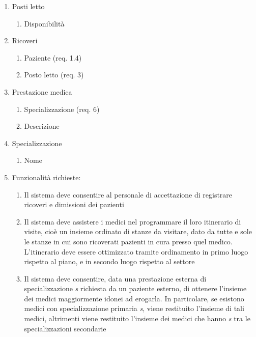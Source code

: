 \documentclass[a4paper,12pt]{report}
\begin{document}
\begin{enumerate}[label*=\arabic*.]
\begin{enumerate}[label*=\arabic*.]
        \end{enumerate}
        \item Posti letto
        \begin{enumerate}[label*=\arabic*.]
            \item Disponibilità
        \end{enumerate}
        \item Ricoveri
        \begin{enumerate}[label*=\arabic*.]
            \item Paziente (req. 1.4)
            \item Posto letto (req. 3)
        \end{enumerate}
        \item Prestazione medica
        \begin{enumerate}[label*=\arabic*.]
            \item Specializzazione (req. 6)
            \item Descrizione
        \end{enumerate}
        \item Specializzazione
        \begin{enumerate}[label*=\arabic*.]
            \item Nome
        \end{enumerate}
        \item Funzionalità richieste:
        \begin{enumerate}[label*=\arabic*.]
            \item Il sistema deve consentire al personale di accettazione di registrare ricoveri e dimissioni dei pazienti
            \item Il sistema deve assistere i medici nel programmare il loro itinerario di visite, cioè un insieme ordinato di stanze da visitare, dato da tutte e sole le stanze in cui sono ricoverati pazienti in cura presso quel medico. L'itinerario deve essere ottimizzato tramite ordinamento in primo luogo rispetto al piano, e in secondo luogo rispetto al settore
            \item Il sistema deve consentire, data una prestazione esterna di specializzazione \textit{s} richiesta da un paziente esterno, di ottenere l'insieme dei medici maggiormente idonei ad erogarla. In particolare, se esistono medici con specializzazione primaria \textit{s}, viene restituito l'insieme di tali medici, altrimenti viene restituito l'insieme dei medici che hanno \textit{s} tra le specializzazioni secondarie
        \end{enumerate}
    \end{enumerate}
\end{document}
